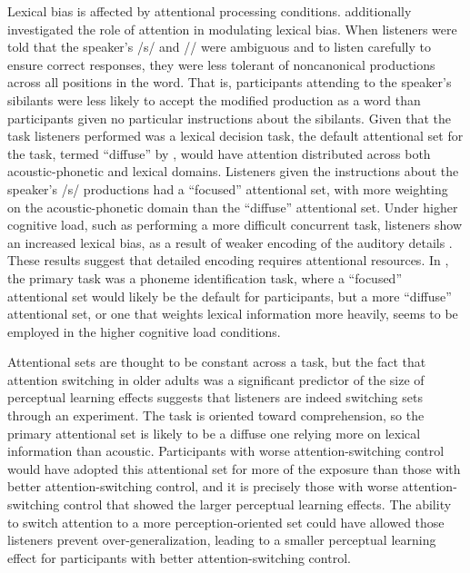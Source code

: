 Lexical bias is affected by attentional processing conditions.
\citet{Pitt2012} additionally investigated the role of attention in modulating lexical bias.  
When listeners were told that the speaker's /s/ and /\textesh/ were ambiguous and to listen carefully to ensure correct responses, they were less tolerant of noncanonical productions across all positions in the word.  
That is, participants attending to the speaker's sibilants were less likely to accept the modified production as a word than participants given no particular instructions about the sibilants.
Given that the task listeners performed was a lexical decision task, the default attentional set for the task, termed ``diffuse'' by \citet{Pitt2012}, would have attention distributed across both acoustic-phonetic and lexical domains.  Listeners given the instructions about the speaker's /s/ productions had a ``focused'' attentional set, with more weighting on the acoustic-phonetic domain than the ``diffuse'' attentional set.
Under higher cognitive load, such as performing a more difficult concurrent task, listeners show an increased lexical bias, as a result of weaker encoding of the auditory details \citep{Mattys2011}.  These results suggest that detailed encoding requires attentional resources.  In \citet{Mattys2011}, the primary task was a phoneme identification task, where a ``focused'' attentional set would likely be the default for participants, but a more ``diffuse'' attentional set, or one that weights lexical information more heavily, seems to be employed in the higher cognitive load conditions.

Attentional sets are thought to be constant across a task, but the fact that attention switching in older adults was a significant predictor of the size of perceptual learning effects \citep{Scharenborg2014} suggests that listeners are indeed switching sets through an experiment.  
The task is oriented toward comprehension, so the primary attentional set is likely to be a diffuse one relying more on lexical information than acoustic.
Participants with worse attention-switching control would have adopted this attentional set for more of the exposure than those with better attention-switching control, and it is precisely those with worse attention-switching control that showed the larger perceptual learning effects.
The ability to switch attention to a more perception-oriented set could have allowed those listeners prevent over-generalization, leading to a smaller perceptual learning effect for participants with better attention-switching control. 

